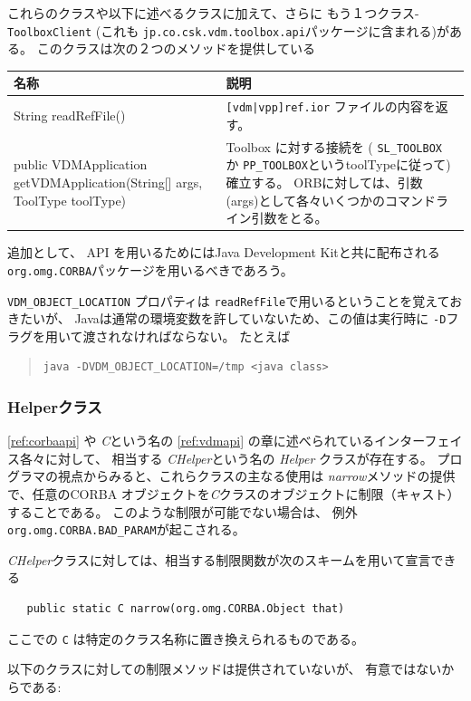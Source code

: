 \documentclass[\pformat,12pt]{jarticle}
\newcommand{\pbs}[1]{\let\temp=\\#1\let\\=\temp}
\newenvironment{interfacetable}{%
  \begin{longtable}{|>{\pbs\raggedright\ttfamily}p{6.6cm}%
                    |>{\pbs\raggedright}p{6.6cm}|} \hline
  \textrm{\bfseries 名称} &  \textbf{説明} \\ \hline
  \endhead
  }{\end{longtable}}
\begin{document}
これらのクラスや以下に述べるクラスに加えて、さらに
もう１つクラス-\texttt{ToolboxClient}
 (これも \texttt{jp.co.csk.vdm.toolbox.api}パッケージに含まれる)がある。
このクラスは次の２つのメソッドを提供している

\begin{interfacetable}
String readRefFile()
& \texttt{[vdm|vpp]ref.ior} ファイルの内容を返す。\\ \hline
%
public VDMApplication getVDMApplication(String[] args, ToolType toolType)
& Toolbox に対する接続を
    ( {\tt SL\_TOOLBOX} か {\tt PP\_TOOLBOX}というtoolTypeに従って)
    確立する。
  ORBに対しては、引数 (args)として各々いくつかのコマンドライン引数をとる。
   \\ \hline
\end{interfacetable}

追加として、 API を用いるためにはJava Development Kitと共に配布される\texttt{org.omg.CORBA}パッケージを用いるべきであろう。

 \texttt{VDM\_OBJECT\_LOCATION} プロパティは 
\texttt{readRefFile}で用いるということを覚えておきたいが、
Javaは通常の環境変数を許していないため、この値は実行時に \texttt{-D}フラグを用いて渡されなければならない。
 たとえば 
\begin{quote}
\begin{verbatim}
java -DVDM_OBJECT_LOCATION=/tmp <java class>
\end{verbatim}
\end{quote}

\subsubsection{Helperクラス}
\ref{ref:corbaapi} や \textit{C}という名の \ref{ref:vdmapi} の章に述べられているインターフェイス各々に対して、 相当する \textit{CHelper}という名の \textit{Helper} クラスが存在する。
プログラマの視点からみると、これらクラスの主なる使用は \textit{narrow}メソッドの提供で、任意のCORBA オブジェクトを\textit{C}クラスのオブジェクトに制限（キャスト）することである。
このような制限が可能でない場合は、 例外\texttt{org.omg.CORBA.BAD\_PARAM}が起こされる。

 \textit{CHelper}クラスに対しては、相当する制限関数が次のスキームを用いて宣言できる
\begin{verbatim}
   public static C narrow(org.omg.CORBA.Object that)
\end{verbatim}
ここでの \texttt{C} は特定のクラス名称に置き換えられるものである。

以下のクラスに対しての制限メソッドは提供されていないが、
有意ではないからである: 
\end{document}
